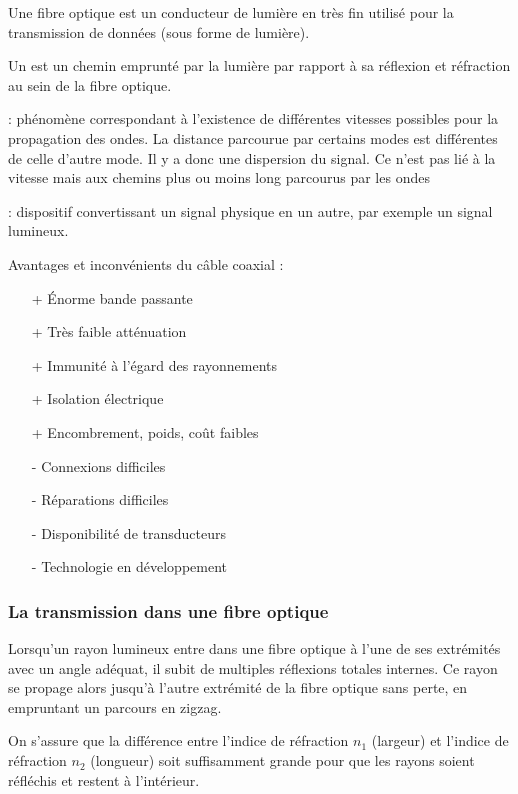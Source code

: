 Une fibre optique est un conducteur de lumière en  très fin utilisé pour la transmission de données (sous forme de lumière).

Un  est un chemin emprunté par la lumière par rapport à sa réflexion et réfraction au sein de la fibre optique.

 : phénomène correspondant à l'existence de différentes vitesses possibles pour la propagation des ondes. La distance parcourue par certains modes est différentes de celle d'autre mode. Il y a donc une dispersion du signal. Ce n'est pas lié à la vitesse mais aux chemins plus ou moins long parcourus par les ondes

 : dispositif convertissant un signal physique en un autre, par exemple un signal lumineux.

Avantages et inconvénients du câble coaxial :
\begin{itemize}
	\item[+] Énorme bande passante
	\item[+] Très faible atténuation
	\item[+] Immunité à l'égard des rayonnements
	\item[+] Isolation électrique
	\item[+] Encombrement, poids, coût faibles
	\item[-] Connexions difficiles
	\item[-] Réparations difficiles
	\item[-] Disponibilité de transducteurs
	\item[-] Technologie en développement
\end{itemize}

\subsubsection{La transmission dans une fibre optique}

Lorsqu'un rayon lumineux entre dans une fibre optique à l'une de ses extrémités avec un angle adéquat, il subit de multiples réflexions totales internes. Ce rayon se propage alors jusqu'à l'autre extrémité de la fibre optique sans perte, en empruntant un parcours en zigzag.

On s'assure que la différence entre l'indice de réfraction $n_1$ (largeur) et l'indice de réfraction $n_2$ (longueur) soit suffisamment grande pour que les rayons soient réfléchis et restent à l'intérieur.

